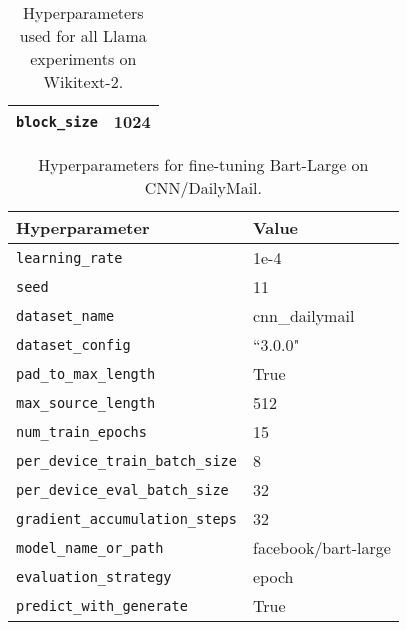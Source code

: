 \begin{table}[ht]
\begin{tabular}{ll}
\texttt{block\_size}           & 1024 \\
\bottomrule
\end{tabular}
\caption{Hyperparameters used for all Llama experiments on Wikitext-2.}
\label{tab:wikitext2_hparams}
\end{table}



\begin{table}[ht!]
\centering
\begin{tabular}{ll}
\toprule
\textbf{Hyperparameter} & \textbf{Value} \\
\midrule
\texttt{learning\_rate} & 1e-4 \\
\texttt{seed} & 11 \\
\texttt{dataset\_name} & cnn\_dailymail \\
\texttt{dataset\_config} & ``3.0.0" \\
\texttt{pad\_to\_max\_length} & True \\
\texttt{max\_source\_length} & 512 \\
\texttt{num\_train\_epochs} & 15 \\
\texttt{per\_device\_train\_batch\_size} & 8 \\
\texttt{per\_device\_eval\_batch\_size} & 32 \\
\texttt{gradient\_accumulation\_steps} & 32 \\
\texttt{model\_name\_or\_path} & facebook/bart-large \\
\texttt{evaluation\_strategy} & epoch \\
\texttt{predict\_with\_generate} & True \\
\bottomrule
\end{tabular}
\caption{Hyperparameters for fine-tuning Bart-Large on CNN/DailyMail.}
\label{tab:cnn_dailymail_hparams}
\end{table}



